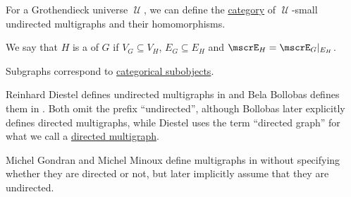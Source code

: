 \begin{definition}
\begin{thmenum}[resume=def:undirected_multigraph]
     For a Grothendieck universe \( \mscrU \), we can define the \hyperref[def:category]{category} of \( \mscrU \)-small undirected multigraphs and their homomorphisms.

    \mimprovised We say that \( H \) is a  of \( G \) if \( V_G \subseteq V_H \), \( E_G \subseteq E_H \) and \( \mscrE_H = \mscrE_G\restr_{E_H} \).

    Subgraphs correspond to \hyperref[def:subobject_and_quotient]{categorical subobjects}.
  \end{thmenum}
\end{definition}
\begin{comments}
  \item Reinhard Diestel defines undirected multigraphs in \cite[28]{Diestel2005} and Bela Bollobas defines them in \cite[6]{Bollobas1998}. Both omit the prefix \enquote{undirected}, although Bollobas later explicitly defines directed multigraphs, while Diestel uses the term \enquote{directed graph} for what we call a \hyperref[def:directed_multigraph]{directed multigraph}.

  Michel Gondran and Michel Minoux define multigraphs in \cite[3]{GondranMinoux1984Graphs} without specifying whether they are directed or not, but later implicitly assume that they are undirected.
\end{comments}

